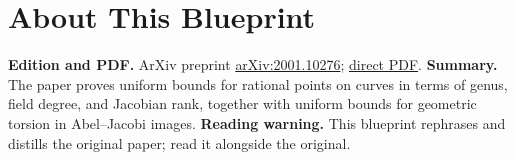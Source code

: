 

\chapter*{About This Blueprint}
\label{uniformity-mordell-lang-curves-about}

\textbf{Edition and PDF.} ArXiv preprint \href{https://arxiv.org/abs/2001.10276}{arXiv:2001.10276};
\href{https://arxiv.org/pdf/2001.10276}{direct PDF}.
\textbf{Summary.} The paper proves uniform bounds for rational points on curves in terms of genus, field degree,
and Jacobian rank, together with uniform bounds for geometric torsion in Abel--Jacobi images.
\textbf{Reading warning.} This blueprint rephrases and distills the original paper; read it alongside the original.















